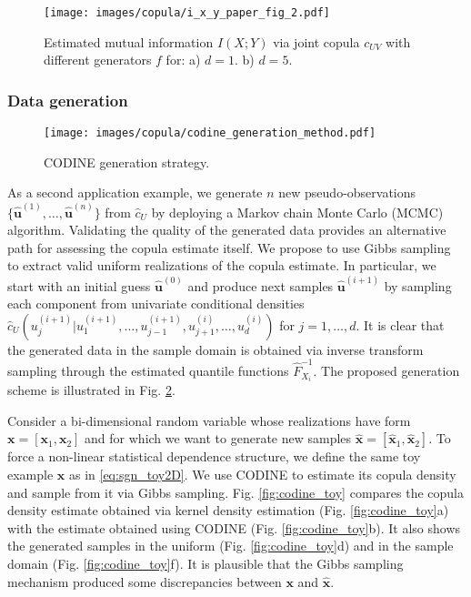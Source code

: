 \begin{figure}
	\centering
	\texttt{[image: images/copula/i\_x\_y\_paper\_fig\_2.pdf]}
	\caption{Estimated mutual information $I(X;Y)$ via joint copula $c_{UV}$ with different generators $f$ for: a) $d=1$. b) $d=5$.}
	\label{fig:codine_i_x_y}
\end{figure}

\subsubsection{Data generation}
\begin{figure}[b]
	\centering
	\texttt{[image: images/copula/codine\_generation\_method.pdf]}
	\caption{CODINE generation strategy.}
	\label{fig:codine_generation}
\end{figure}
As a second application example, we generate $n$ new pseudo-observations $\{\hat{\mathbf{u}}^{(1)},\dots,\hat{\mathbf{u}}^{(n)}\}$ from $\hat{c}_U$ by deploying a Markov chain Monte Carlo (MCMC) algorithm. Validating the quality of the generated data provides an alternative path for assessing the copula estimate itself.
We propose to use Gibbs sampling to extract valid uniform realizations of the copula estimate. In particular, we start with an initial guess $\hat{\mathbf{u}}^{(0)}$ and produce next samples $\hat{\mathbf{u}}^{(i+1)}$ by sampling each component from univariate conditional densities $\hat{c}_U(u_j^{(i+1)}|u_1^{(i+1)},\dots,u_{j-1}^{(i+1)},u_{j+1}^{(i)},\dots,u_{d}^{(i)})$ for $j=1,\dots,d$.
It is clear that the generated data in the sample domain is obtained via inverse transform sampling through the estimated quantile functions $\hat{F}_{X_i}^{-1}$.
The proposed generation scheme is illustrated in Fig. \ref{fig:codine_generation}.

Consider a bi-dimensional random variable whose realizations have form $\mathbf{x} = [\mathbf{x}_1, \mathbf{x}_2]$ and for which we want to generate new samples $\mathbf{\hat{x}} = [\mathbf{\hat{x}}_1, \mathbf{\hat{x}}_2]$. To force a non-linear statistical dependence structure, we define the same toy example $\mathbf{x}$ as in \eqref{eq:sgn_toy2D}.
We use CODINE to estimate its copula density and sample from it via Gibbs sampling. Fig. \ref{fig:codine_toy} compares the copula density estimate obtained via kernel density estimation (Fig. \ref{fig:codine_toy}a) with the estimate obtained using CODINE (Fig. \ref{fig:codine_toy}b). It also shows the generated samples in the uniform (Fig. \ref{fig:codine_toy}d) and in the sample domain (Fig. \ref{fig:codine_toy}f). 
It is plausible that the Gibbs sampling mechanism produced some discrepancies between $\mathbf{x}$ and $\hat{\mathbf{x}}$.

